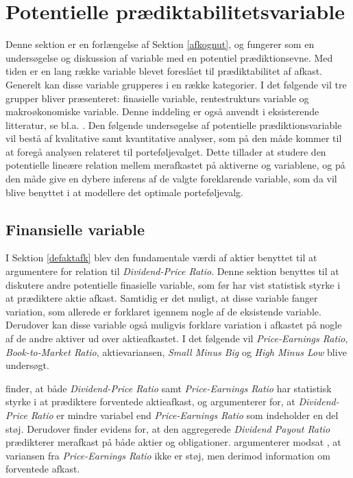 \documentclass[
  a4paper,
  oneside]{memoir}
\begin{document}
\hypertarget{potpradik}{%
\section{Potentielle prædiktabilitetsvariable}\label{potpradik}}

Denne sektion er en forlængelse af Sektion \ref{afkognut}, og fungerer som en undersøgelse og diskussion af variable med en potentiel prædiktionsevne. Med tiden er en lang række variable blevet foreslået til prædiktabilitet af afkast. Generelt kan disse variable grupperes i en række kategorier. I det følgende vil tre grupper bliver præsenteret: finasielle variable, rentestrukturs variable og makroøkonomiske variable. Denne inddeling er også anvendt i eksisterende litteratur, se bl.a. \citep{Koijen2011}. Den følgende undersøgelse af potentielle prædiktionsvariable vil bestå af kvalitative samt kvantitative analyser, som på den måde kommer til at foregå analysen relateret til porteføljevalget. Dette tillader at studere den potentielle lineære relation mellem merafkastet på aktiverne og variablene, og på den måde give en dybere inferens af de valgte foreklarende variable, som da vil blive benyttet i at modellere det optimale porteføljevalg.

\hypertarget{finansielle-variable}{%
\subsection{Finansielle variable}\label{finansielle-variable}}

I Sektion \ref{defaktafk} blev den fundamentale værdi af aktier benyttet til at argumentere for relation til \emph{Dividend-Price Ratio}. Denne sektion benyttes til at diskutere andre potentielle finasielle variable, som før har vist statistisk styrke i at prædiktere aktie afkast. Samtidig er det muligt, at disse variable fanger variation, som allerede er forklaret igennem nogle af de eksistende variable. Derudover kan disse variable også muligvis forklare variation i afkastet på nogle af de andre aktiver ud over aktieafkastet. I det følgende vil \emph{Price-Earnings Ratio}, \emph{Book-to-Market Ratio}, aktievariansen, \emph{Small Minus Big} og \emph{High Minus Low} blive undersøgt.

\citep{Fama1988} finder, at både \emph{Dividend-Price Ratio} samt \emph{Price-Earnings Ratio} har statistisk styrke i at prædiktere forventede aktieafkast, og argumenterer for, at \emph{Dividend-Price Ratio} er mindre variabel end \emph{Price-Earnings Ratio} som indeholder en del støj. Derudover finder \citep{Lamont1998} evidens for, at den aggregerede \emph{Dividend Payout Ratio} prædikterer merafkast på både aktier og obligationer. \citep{Lamont1998} argumenterer modsat \citep{Fama1988}, at variansen fra \emph{Price-Earnings Ratio} ikke er støj, men derimod information om forventede afkast.
\end{document}
